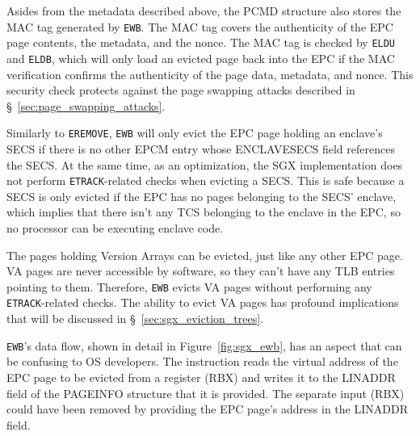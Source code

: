Asides from the metadata described above, the PCMD structure also stores the
MAC tag generated by \texttt{EWB}. The MAC tag covers the authenticity of the
EPC page contents, the metadata, and the nonce. The MAC tag is checked by
\texttt{ELDU} and \texttt{ELDB}, which will only load an evicted page back into
the EPC if the MAC verification confirms the authenticity of the page data,
metadata, and nonce. This security check protects against the page swapping
attacks described in \S~\ref{sec:page_swapping_attacks}.


Similarly to \texttt{EREMOVE}, \texttt{EWB} will only evict the EPC page
holding an enclave's SECS if there is no other EPCM entry whose ENCLAVESECS
field references the SECS. At the same time, as an optimization, the SGX
implementation does not perform \texttt{ETRACK}-related checks when evicting a
SECS. This is safe because a SECS is only evicted if the EPC has no pages
belonging to the SECS' enclave, which implies that there isn't any TCS
belonging to the enclave in the EPC, so no processor can be executing enclave
code.


The pages holding Version Arrays can be evicted, just like any other EPC page.
VA pages are never accessible by software, so they can't have any TLB entries
pointing to them. Therefore, \texttt{EWB} evicts VA pages without performing
any \texttt{ETRACK}-related checks. The ability to evict VA pages has profound
implications that will be discussed in \S~\ref{sec:sgx_eviction_trees}.

\texttt{EWB}'s data flow, shown in detail in Figure~\ref{fig:sgx_ewb}, has an
aspect that can be confusing to OS developers. The instruction reads the
virtual address of the EPC page to be evicted from a register (RBX) and writes
it to the LINADDR field of the PAGEINFO structure that it is provided. The
separate input (RBX) could have been removed by providing the EPC page's address
in the LINADDR field.

